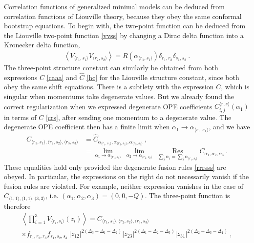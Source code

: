 \documentclass[12pt, a4paper, notitlepage, twoside]{report}
\numberwithin{equation}{section}
\theoremstyle{break}
\begin{document}
Correlation functions of generalized minimal models can be deduced from correlation functions of Liouville theory, because they obey the same conformal bootstrap equations.
To begin with, the two-point function can be deduced from the Liouville two-point function \eqref{vvss} by changing a Dirac delta function into a Kronecker delta function, 
\begin{align}
 \boxed{\left\langle V_{\langle r_1,s_1 \rangle} V_{\langle r_2,s_2 \rangle} \right\rangle = R(\alpha_{\langle r_1,s_1 \rangle}) \delta_{r_1,r_2} \delta_{s_1,s_2}}\ .
\label{vvdd}
\end{align}
The three-point structure constant can similarly be obtained from both expressions $C$ \eqref{caaa} and $\hat C$ \eqref{hc} for the Liouville structure constant, since both obey the same shift equations. 
There is a subtlety with the expression $C$, which is singular when momentums take degenerate values. 
But we already found the correct regularization when we expressed degenerate OPE coefficients $C_{i,j}^{\langle r,s \rangle}(\alpha_1)$ in terms of $C$ \eqref{crs}, after sending one momentum to a degenerate value. 
The degenerate OPE coefficient then has a finite limit when $\alpha_1\to \alpha_{\langle r_1,s_1 \rangle}$, and we have
\begin{align}
 C_{\langle r_1,s_1\rangle ,\langle r_2,s_2\rangle ,\langle r_3,s_3 \rangle} 
 &= \hat{C}_{\alpha_{\langle r_1,s_1 \rangle}, \alpha_{\langle r_2,s_2 \rangle} ,\alpha_{\langle r_3,s_3 \rangle} } \ ,
 \label{chc}
 \\
& = \underset{\alpha_1\to \alpha_{\langle r_1,s_1 \rangle}}{\lim}\ 
\underset{\alpha_2\to \alpha_{\langle r_2,s_2 \rangle}}{\lim}\ 
\underset{\sum_i \alpha_i = \sum_i \alpha_{\langle r_i,s_i \rangle} }{\operatorname{ Res}} C_{\alpha_1,\alpha_2,\alpha_3}\ .
\label{clc}
\end{align}
These equalities hold only provided the degenerate fusion rules \eqref{rrrsss} are obeyed.
In particular, the expressions on the right do not necessarily vanish if the fusion rules are violated.
For example, neither expression vanishes in the case of $C_{\langle 1,1\rangle , \langle 1,1 \rangle,\langle 3,3 \rangle}$, i.e. $(\alpha_1,\alpha_2,\alpha_3)=(0,0,-Q)$.
The three-point function is therefore 
\begin{multline}
 \left\langle \prod_{i=1}^3 V_{\langle r_i,s_i \rangle}(z_i) \right\rangle = C_{\langle r_1,s_1\rangle ,\langle r_2,s_2\rangle ,\langle r_3,s_3 \rangle}  
\\ \times 
f_{r_1,r_2,r_3} f_{s_1,s_2,s_3}\ |z_{12}|^{2(\Delta_3-\Delta_1-\Delta_2)} |z_{23}|^{2(\Delta_1-\Delta_2-\Delta_3)} |z_{31}|^{2(\Delta_2-\Delta_3-\Delta_1)}\ ,
\end{multline}
\end{document}
